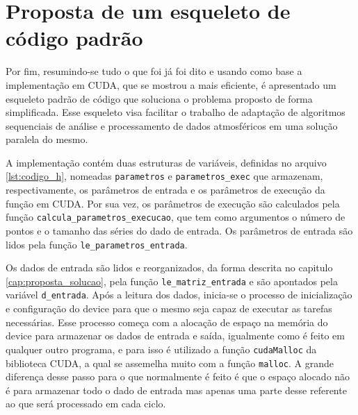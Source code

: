 \chapter{Proposta de um esqueleto de código padrão}

Por fim, resumindo-se tudo o que foi já foi dito e usando como base a implementação em CUDA, que se mostrou a mais eficiente, é apresentado um esqueleto padrão de código que soluciona o problema proposto de forma simplificada. Esse esqueleto visa facilitar o trabalho de adaptação de algoritmos sequenciais de análise e processamento de dados atmosféricos em uma solução paralela do mesmo. 

A implementação contém duas estruturas de variáveis, definidas no arquivo \ref{lst:codigo_h}, nomeadas \texttt{parametros} e \texttt{parametros\_exec} que armazenam, respectivamente, os parâmetros de entrada e os parâmetros de execução da função em CUDA. Por sua vez, os parâmetros de execução são calculados pela função \texttt{calcula\_parametros\_execucao}, que tem como argumentos o número de pontos e o tamanho das séries do dado de entrada. Os parâmetros de entrada são lidos pela função \texttt{le\_parametros\_entrada}.

Os dados de entrada são lidos e reorganizados, da forma descrita no capitulo \ref{cap:proposta_solucao}, pela função \texttt{le\_matriz\_entrada} e são apontados pela variável \texttt{d\_entrada}. Após a leitura dos dados, inicia-se o processo de inicialização e configuração do device para que o mesmo seja capaz de executar as tarefas necessárias. Esse processo começa com a alocação de espaço na memória do device para armazenar os dados de entrada e saída, igualmente como é feito em qualquer outro programa, e para isso é utilizado a função \texttt{cudaMalloc} da biblioteca CUDA, a qual se assemelha muito com a função \texttt{malloc}. A grande diferença desse passo para o que normalmente é feito é que o espaço alocado não é para armazenar todo o dado de entrada mas apenas uma parte desse referente ao que será processado em cada ciclo.

